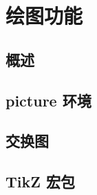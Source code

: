 \chapter{绘图功能}

\leavevmode\nobreakspace

\section{概述}

\leavevmode\nobreakspace

\section{picture 环境}

\leavevmode\nobreakspace

\section{交换图}

\leavevmode\nobreakspace

\section{TikZ 宏包}

\leavevmode\nobreakspace

\endinput